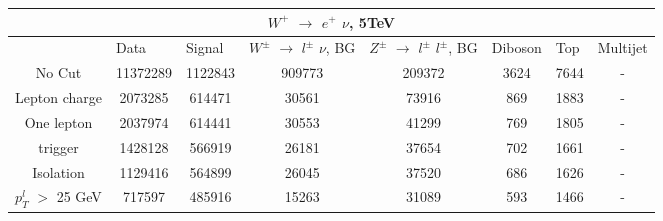 \documentclass[10pt]{article}
\begin{document}
 										
\begin{center}										
\begin{table}[H] 										
\begin{adjustbox}{width=1\textwidth}								
\begin{tabular}{cccccccc} 									
\\ \hline \hline  										
\multicolumn{8}{c}{$W^{+}$ $\rightarrow$ $e^{+}$ $\nu$, 5TeV}  									
\\ \hline \hline                            						
\multicolumn{1}{|c|}{}   & \multicolumn{1}{l|}{Data} & \multicolumn{1}{l|}{Signal} & \multicolumn{1}{l|}{$W^{\pm}$ $\rightarrow$ $l^{\pm}$ $\nu$, BG} & \multicolumn{1}{l|}{$Z^{\pm}$ $\rightarrow$ $l^{\pm}$ $l^{\pm}$, BG} & \multicolumn{1}{l|}{Diboson} & \multicolumn{1}{l|}{Top} & \multicolumn{1}{l|}{Multijet} \\ \hline 
\multicolumn{1}{|c|}{No Cut}  & \multicolumn{1}{c|}{11372289} & \multicolumn{1}{c|}{1122843} & \multicolumn{1}{c|}{909773} & \multicolumn{1}{c|}{209372} & \multicolumn{1}{c|}{3624} & \multicolumn{1}{c|}{7644} & \multicolumn{1}{c|}{-}  \\ \hline 
\multicolumn{1}{|c|}{Lepton charge}  & \multicolumn{1}{c|}{2073285} & \multicolumn{1}{c|}{614471} & \multicolumn{1}{c|}{30561} & \multicolumn{1}{c|}{73916} & \multicolumn{1}{c|}{869} & \multicolumn{1}{c|}{1883} & \multicolumn{1}{c|}{-}  \\ \hline 
\multicolumn{1}{|c|}{One lepton}  & \multicolumn{1}{c|}{2037974} & \multicolumn{1}{c|}{614441} & \multicolumn{1}{c|}{30553} & \multicolumn{1}{c|}{41299} & \multicolumn{1}{c|}{769} & \multicolumn{1}{c|}{1805} & \multicolumn{1}{c|}{-}  \\ \hline 
\multicolumn{1}{|c|}{trigger}  & \multicolumn{1}{c|}{1428128} & \multicolumn{1}{c|}{566919} & \multicolumn{1}{c|}{26181} & \multicolumn{1}{c|}{37654} & \multicolumn{1}{c|}{702} & \multicolumn{1}{c|}{1661} & \multicolumn{1}{c|}{-}  \\ \hline 
\multicolumn{1}{|c|}{Isolation}  & \multicolumn{1}{c|}{1129416} & \multicolumn{1}{c|}{564899} & \multicolumn{1}{c|}{26045} & \multicolumn{1}{c|}{37520} & \multicolumn{1}{c|}{686} & \multicolumn{1}{c|}{1626} & \multicolumn{1}{c|}{-}  \\ \hline 
\multicolumn{1}{|c|}{$p_{T}^{l}$ $>$ 25 GeV}  & \multicolumn{1}{c|}{717597} & \multicolumn{1}{c|}{485916} & \multicolumn{1}{c|}{15263} & \multicolumn{1}{c|}{31089} & \multicolumn{1}{c|}{593} & \multicolumn{1}{c|}{1466} & \multicolumn{1}{c|}{-}  \\ \hline 

\end{tabular}
\end{adjustbox}
\end{table}
\end{center}
\end{document}
